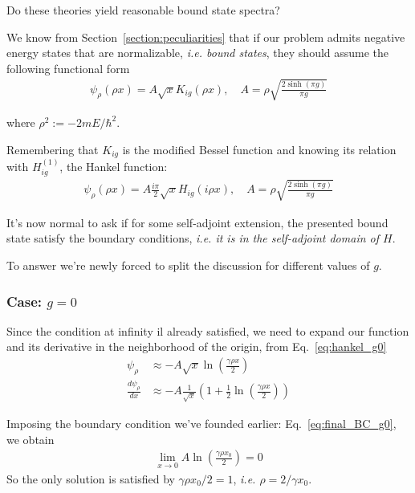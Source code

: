Do these theories yield reasonable bound state spectra?

\vspace{4mm}
\noindent
We know from Section~\ref{section:peculiarities} that if our problem admits negative energy states that are normalizable, \textit{i.e. bound states}, they should assume the following functional form
\begin{align*}
    \psi_\rho(\rho x) = A \sqrt{x} K_{ig}(\rho x), \quad A = \rho \sqrt{\frac{2 \sinh(\pi g)}{\pi g}}
\end{align*}

where $\rho^2 := - 2mE/\hbar^2$.

\noindent
Remembering that $K_{ig}$ is the modified Bessel function and knowing its relation with $H_{ig}^{(1)}$, the Hankel function:
\begin{align*}
    \psi_\rho(\rho x) = A \frac{i\pi}{2} \sqrt{x} H_{ig}(i \rho x), \quad A = \rho \sqrt{\frac{2 \sinh(\pi g)}{\pi g}}
\end{align*}

\noindent
It's now normal to ask if for some self-adjoint extension, the presented bound state satisfy the boundary conditions, \textit{i.e. it is in the self-adjoint domain of $H$}.

\vspace{4mm}
\noindent
To answer we're newly forced to split the discussion for different values of $g$.

\subsubsection{Case: \(g = 0\)}

Since the condition at infinity il already satisfied, we need to expand our function and its derivative in the neighborhood of the origin, from Eq.~\eqref{eq:hankel_g0} 
\begin{align*}
    \psi_\rho &\approx - A \sqrt{x} \ln{ \left( \frac{\gamma \rho x}{2} \right) } \\
    \frac{d\psi_\rho}{dx} &\approx -A \frac{1}{\sqrt{x}} \left(1+\frac{1}{2}\ln{ \left( \frac{\gamma \rho x}{2} \right) }\right)
\end{align*}

\clearpage

\noindent
Imposing the boundary condition we've founded earlier: Eq.~\eqref{eq:final_BC_g0}, we obtain
\begin{align*}
    \lim_{x \to 0} A \ln(\frac{\gamma \rho x_0}{2}) = 0
\end{align*}
So the only solution is satisfied by $\gamma \rho x_0/2 = 1$, \textit{i.e. $\rho = 2/\gamma x_0$}.

